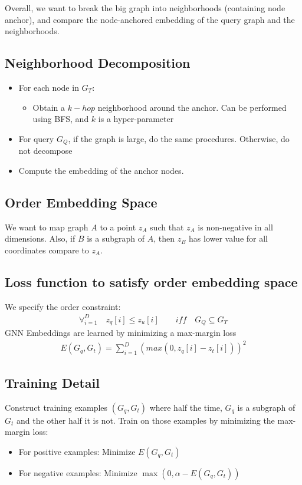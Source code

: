 Overall, we want to break the big graph into neighborhoods (containing node anchor), and compare the node-anchored embedding of the query graph and the neighborhoods. 

\subsection{Neighborhood Decomposition} 
\begin{itemize}
    \item For each node in $G_T$:
        \begin{itemize}
            \item Obtain a $k-hop$ neighborhood around the anchor. Can be performed using BFS, and $k$ is a hyper-parameter
        \end{itemize}
    \item For query $G_Q$, if the graph is large, do the same procedures. Otherwise, do not decompose
    \item Compute the embedding of the anchor nodes. 
\end{itemize}

\subsection{Order Embedding Space} 
We want to map graph $A$ to a point $z_A$ such that $z_A$ is non-negative in all dimensions. Also, if $B$ is a subgraph of $A$, then $z_B$ has lower value for all coordinates compare to $z_A$. 

\subsection{Loss function to satisfy order embedding space} 
We specify the order constraint: 
    \begin{align*}
        \forall_{i=1}^D \quad z_q[i] \leq z_u[i] \qquad iff  \quad G_Q \subseteq G_T
    \end{align*}
GNN Embeddings are learned by minimizing a max-margin loss
    \begin{align*}
        E(G_q, G_t) = \sum_{i=1}^D(max(0, z_q[i] - z_t[i]))^2
    \end{align*}
    
\subsection{Training Detail} 
Construct training examples $(G_q, G_t)$ where half the time, $G_q$ is a subgraph of $G_t$ and the other half it is not. Train on those examples by minimizing the max-margin loss:
    \begin{itemize}
        \item For positive examples: Minimize $E(G_q, G_t)$ 
        \item For negative examples: Minimize $\max(0, \alpha - E(G_q, G_t))$
    \end{itemize}


